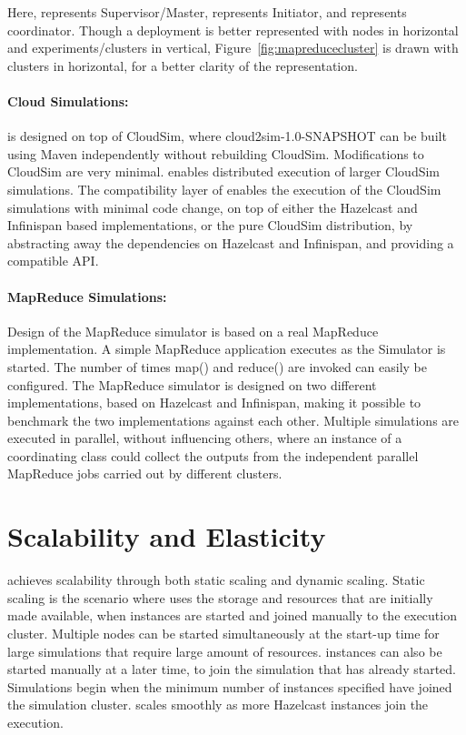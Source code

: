 Here,  represents Supervisor/Master,  represents Initiator, and  represents coordinator. Though a deployment is better represented with nodes in horizontal and experiments/clusters in vertical, Figure~\ref{fig:mapreducecluster} is drawn with clusters in horizontal, for a better clarity of the representation.

\paragraph*{Cloud Simulations:}
 is designed on top of CloudSim, where cloud2sim-1.0-SNAPSHOT can be built using Maven independently without rebuilding CloudSim. Modifications to CloudSim are very minimal.  enables distributed execution of larger CloudSim simulations. The compatibility layer of  enables the execution of the CloudSim simulations with minimal code change, on top of either the Hazelcast and Infinispan based implementations, or the pure CloudSim distribution, by abstracting away the dependencies on Hazelcast and Infinispan, and providing a compatible API. 

\paragraph*{MapReduce Simulations:}
Design of the MapReduce simulator is based on a real MapReduce implementation. A simple MapReduce application executes as the Simulator is started. The number of times map() and reduce() are invoked can easily be configured. The MapReduce simulator is designed on two different implementations, based on Hazelcast and Infinispan, making it possible to benchmark the two implementations against each other. Multiple simulations are executed in parallel, without influencing others, where an instance of a coordinating class could collect the outputs from the independent parallel MapReduce jobs carried out by different clusters. 

\section{Scalability and Elasticity}
\label{sec:3se}
 achieves scalability through both static scaling and dynamic scaling. Static scaling is the scenario where  uses the storage and resources that are initially made available, when instances are started and joined manually to the execution cluster. Multiple nodes can be started simultaneously at the start-up time for large simulations that require large amount of resources.  instances can also be started manually at a later time, to join the simulation that has already started. Simulations begin when the minimum number of instances specified have joined the simulation cluster.  scales smoothly as more Hazelcast instances join the execution. 

